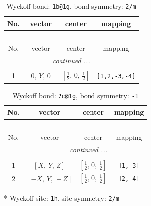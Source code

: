\documentclass[fleqn,8pt]{jsarticle}
\begin{document}
\begin{longtable}{cccc}
\caption{Wyckoff bond: {\tt 1b@1g}, bond symmetry: {\tt 2/m}}
 \\
 \hline \hline
No. & vector & center & mapping \\ \hline \endfirsthead

\multicolumn{3}{l}{\tablename\ \thetable{}} \\
 \hline \hline
No. & vector & center & mapping \\ \hline \endhead

 \hline \hline
\multicolumn{3}{r}{\footnotesize\it continued ...} \\ \endfoot

 \hline \hline
\multicolumn{3}{r}{} \\ \endlastfoot

1 & $\left[ 0,\, Y,\, 0 \right]$ & $\left[ \frac{1}{2},\, 0,\, \frac{1}{2} \right]$ & {\tt [1,2,-3,-4]} \\
\end{longtable}
\renewcommand{\arraystretch}{1.2}
\begin{longtable}{cccc}
\caption{Wyckoff bond: {\tt 2c@1g}, bond symmetry: {\tt -1}}
 \\
 \hline \hline
No. & vector & center & mapping \\ \hline \endfirsthead

\multicolumn{3}{l}{\tablename\ \thetable{}} \\
 \hline \hline
No. & vector & center & mapping \\ \hline \endhead

 \hline \hline
\multicolumn{3}{r}{\footnotesize\it continued ...} \\ \endfoot

 \hline \hline
\multicolumn{3}{r}{} \\ \endlastfoot

1 & $\left[ X,\, Y,\, Z \right]$ & $\left[ \frac{1}{2},\, 0,\, \frac{1}{2} \right]$ & {\tt [1,-3]} \\ \hline
2 & $\left[ - X,\, Y,\, - Z \right]$ & $\left[ \frac{1}{2},\, 0,\, \frac{1}{2} \right]$ & {\tt [2,-4]} \\
\end{longtable}
* Wyckoff site: {\tt 1h}, site symmetry: {\tt 2/m}
\renewcommand{\arraystretch}{1.2}
\end{document}
